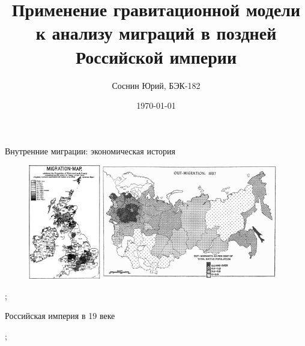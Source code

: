 \documentclass[aspectratio=169]{beamer}
\title[Your Short Title]{Применение гравитационной модели к анализу миграций в поздней Российской империи}
\author{Соснин Юрий, БЭК-182}
\institute{HSE}
\date{\today}
\begin{document}
\begin{frame}
  \titlepage
\end{frame}


\begin{frame}{Внутренние миграции: экономическая история}

\begin{figure}
    \includegraphics[width=0.28\textwidth]{britain.png}
    \includegraphics[width=0.68\textwidth]{russia.png}
\end{figure}

\cite{ravenstein_laws_1885}; \cite{leasure_internal_1968}

\end{frame}

\begin{frame}{Российская империя в 19 веке}



\cite{gregory_russian_1983}; \cite{markevich_regional_2019}

\end{frame}
\end{document}
